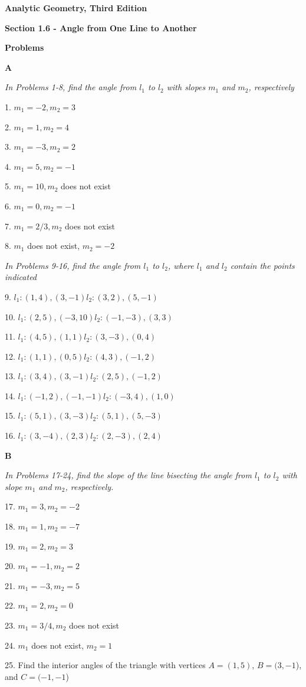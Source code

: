 \documentclass[10pt,letterpaper]{article}
\begin{document}
\textbf{Analytic Geometry, Third Edition}

\textbf{Section 1.6 - Angle from One Line to Another}

\medskip
\textbf{Problems}
\medskip

\textbf{A}
\medskip

\textit{In Problems 1-8, find the angle from $l_1$ to $l_2$ with slopes $m_1$ and $m_2$, respectively}
\medskip

1. $m_1=-2, m_2=3$

2. $m_1=1, m_2=4$

3. $m_1=-3, m_2=2$

4. $m_1=5, m_2=-1$

5. $m_1=10, m_2$ does not exist

6. $m_1=0, m_2=-1$

7. $m_1=2/3, m_2$ does not exist

8. $m_1$ does not exist, $m_2=-2$

\medskip
\textit{In Problems 9-16, find the angle from $l_1$ to $l_2$, where $l_1$ and $l_2$ contain the points indicated}
\medskip

9. $l_1:(1,4), (3,-1) l_2:(3,2),(5,-1)$

10. $l_1:(2,5),(-3,10) l_2:(-1,-3),(3,3)$

11. $l_1:(4,5),(1,1) l_2:(3,-3),(0,4)$

12. $l_1:(1,1),(0,5) l_2:(4,3),(-1,2)$

13. $l_1:(3,4),(3,-1) l_2:(2,5),(-1,2)$

14. $l_1:(-1,2),(-1,-1) l_2:(-3,4),(1,0)$

15. $l_1:(5,1),(3,-3) l_2:(5,1),(5,-3)$

16. $l_1:(3,-4),(2,3) l_2:(2,-3),(2,4)$

\medskip
\textbf{B}
\medskip

\medskip
\textit{In Problems 17-24, find the slope of the line bisecting the angle from $l_1$ to $l_2$ with slope $m_1$ and $m_2$, respectively.}
\medskip

17. $m_1=3, m_2=-2$

18. $m_1=1, m_2=-7$

19. $m_1=2, m_2=3$

20. $m_1=-1, m_2=2$

21. $m_1=-3, m_2=5$

22. $m_1=2, m_2=0$

23. $m_1=3/4, m_2$ does not exist

24. $m_1$ does not exist, $m_2=1$

25. Find the interior angles of the triangle with vertices $A=(1,5)$, $B=(3,-1$), and $C=(-1,-1$)
\end{document}
